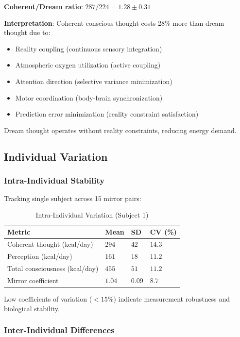 \documentclass[12pt,twocolumn]{article}
\theoremstyle{remark}
\begin{document}
\textbf{Coherent/Dream ratio}: $287 / 224 = 1.28 \pm 0.31$

\textbf{Interpretation}: Coherent conscious thought costs 28\% more than dream thought due to:
\begin{itemize}
\item Reality coupling (continuous sensory integration)
\item Atmospheric oxygen utilization (active coupling)
\item Attention direction (selective variance minimization)
\item Motor coordination (body-brain synchronization)
\item Prediction error minimization (reality constraint satisfaction)
\end{itemize}

Dream thought operates without reality constraints, reducing energy demand.

\subsection{Individual Variation}

\subsubsection{Intra-Individual Stability}

Tracking single subject across 15 mirror pairs:

\begin{table}[H]
\centering
\caption{Intra-Individual Variation (Subject 1)}
\begin{tabular}{@{}llll@{}}
\toprule
\textbf{Metric} & \textbf{Mean} & \textbf{SD} & \textbf{CV (\%)} \\
\midrule
Coherent thought (kcal/day) & $294$ & $42$ & $14.3$ \\
Perception (kcal/day) & $161$ & $18$ & $11.2$ \\
Total consciousness (kcal/day) & $455$ & $51$ & $11.2$ \\
Mirror coefficient & $1.04$ & $0.09$ & $8.7$ \\
\bottomrule
\end{tabular}
\end{table}

Low coefficients of variation ($<15\%$) indicate measurement robustness and biological stability.

\subsubsection{Inter-Individual Differences}
\end{document}
